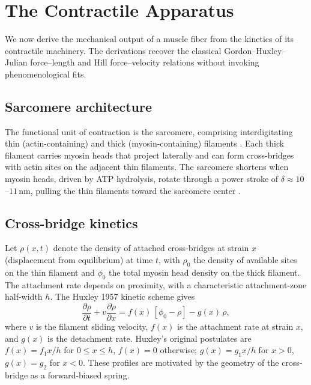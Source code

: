 \documentclass[11pt,twocolumn,a4paper]{article}
\theoremstyle{definition}
\theoremstyle{remark}
\begin{document}
\section{The Contractile Apparatus}
\label{sec:contractile}

We now derive the mechanical output of a muscle fiber from the
kinetics of its contractile machinery. The derivations recover the
classical Gordon--Huxley--Julian force--length and Hill
force--velocity relations without invoking phenomenological fits.

\subsection{Sarcomere architecture}

The functional unit of contraction is the sarcomere, comprising
interdigitating thin (actin-containing) and thick (myosin-containing)
filaments \citep{huxley1954,huxley1954b}. Each thick filament carries
myosin heads that project laterally and can form cross-bridges with
actin sites on the adjacent thin filaments. The sarcomere shortens
when myosin heads, driven by ATP hydrolysis, rotate through a power
stroke of $\delta \approx 10$--$11$\,nm, pulling the thin filaments
toward the sarcomere center \citep{huxley1957,huxley1974,%
piazzesi2007}.

\subsection{Cross-bridge kinetics}

Let $\rho(x, t)$ denote the density of attached cross-bridges at
strain $x$ (displacement from equilibrium) at time $t$, with
$\rho_0$ the density of available sites on the thin filament and
$\phi_0$ the total myosin head density on the thick filament. The
attachment rate depends on proximity, with a characteristic
attachment-zone half-width $h$. The Huxley 1957 kinetic scheme gives
\begin{equation}
\frac{\partial \rho}{\partial t} + v \frac{\partial \rho}{\partial x}
= f(x)\,[\phi_0 - \rho] - g(x)\,\rho,
\label{eq:huxley-kinetic}
\end{equation}
where $v$ is the filament sliding velocity, $f(x)$ is the
attachment rate at strain $x$, and $g(x)$ is the detachment rate.
Huxley's original postulates are $f(x) = f_1 x/h$ for $0 \leq x
\leq h$, $f(x) = 0$ otherwise; $g(x) = g_1 x/h$ for $x > 0$,
$g(x) = g_2$ for $x < 0$. These profiles are motivated by the
geometry of the cross-bridge as a forward-biased spring.
\end{document}
